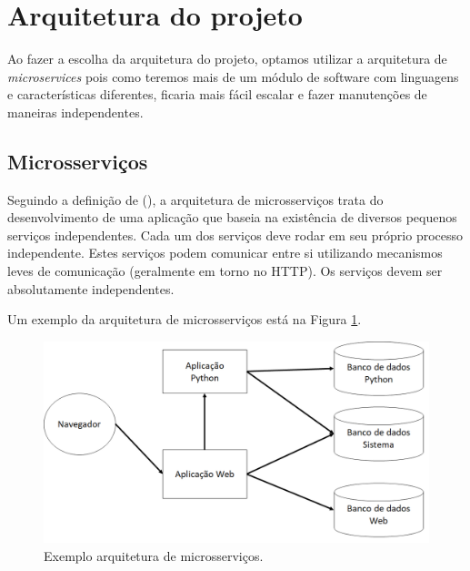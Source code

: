 

\section{Arquitetura do projeto}

Ao fazer a escolha da arquitetura do projeto, optamos utilizar a arquitetura de \textit{microservices} pois como teremos mais de um módulo de software com linguagens e características diferentes, ficaria mais fácil escalar e fazer manutenções de maneiras independentes.

\subsection{Microsserviços}
Seguindo a definição de \citeauthor{ms1} (\citeyear{ms1}), a arquitetura de microsserviços trata do desenvolvimento de uma aplicação que baseia na existência de diversos pequenos serviços independentes. Cada um dos serviços deve rodar em seu próprio processo independente. Estes serviços podem comunicar entre si utilizando mecanismos leves de comunicação (geralmente em torno no HTTP). Os serviços devem ser absolutamente independentes.

Um exemplo da arquitetura de microsserviços está na Figura \ref{fig:arquitetura-microsservicos}.

\begin{figure}[htbp]
	\centering
	\includegraphics[width=1\linewidth]{figuras/WebService/microservices.png}
	\caption{Exemplo arquitetura de microsserviços.}
	\label{fig:arquitetura-microsservicos}
\end{figure}

